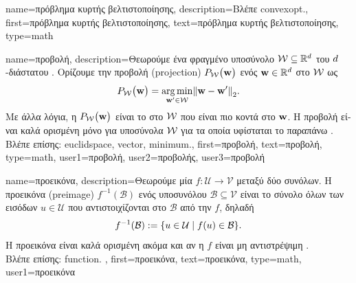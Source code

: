 {name={\foreignlanguage{greek}{πρόβλημα κυρτής βελτιστοποίησης}}, 
	description={\foreignlanguage{greek}{Βλέπε} \gls{convexopt}.},
	first={\foreignlanguage{greek}{πρόβλημα κυρτής βελτιστοποίησης}},
	text={\foreignlanguage{greek}{πρόβλημα κυρτής βελτιστοποίησης}},
	type=math
}

{name={\foreignlanguage{greek}{προβολή}}, 
       description={\foreignlanguage{greek}{Θεωρούμε ένα φραγμένο υποσύνολο} 
       		$\mathcal{W} \subseteq \mathbb{R}^{d}$ \foreignlanguage{greek}{του $d$-διάστατου} 
		. \foreignlanguage{greek}{Ορίζουμε την προβολή} (projection) $P_{\mathcal{W}}\big( {\bf w}\big)$ 
		 \foreignlanguage{greek}{ενός}  ${\bf w} \in \mathbb{R}^{d}$ \foreignlanguage{greek}{στο $\mathcal{W}$ ως}
		\begin{equation} 
   	    		\nonumber
			\label{equ_def_proj_generic_dict}
  	     		\projection{\paramspace}{\weights} = \argmin_{\weights' \in \paramspace} \normgeneric{\weights - \weights'}{2}. 
         	\end{equation}
		 \foreignlanguage{greek}{Με άλλα λόγια, η $P_{\mathcal{W}}\big( {\bf w}\big)$ είναι το}  
		 \foreignlanguage{greek}{στο $\mathcal{W}$ που είναι πιο κοντά στο ${\bf w}$. Η προβολή είναι καλά ορισμένη μόνο 
		 για υποσύνολα $\mathcal{W}$ για τα οποία υφίσταται το παραπάνω}  \cite{BoydConvexBook}.
		 \\
		 \foreignlanguage{greek}{Βλέπε επίσης:} \gls{euclidspace}, \gls{vector}, \gls{minimum}.},
	first={\foreignlanguage{greek}{προβολή}},
	text={\foreignlanguage{greek}{προβολή}},
	type=math,
	user1={\foreignlanguage{greek}{προβολή}}, %
	user2={\foreignlanguage{greek}{προβολής}}, %
	user3={\foreignlanguage{greek}{προβολή}} %
}

{name={\foreignlanguage{greek}{προεικόνα}}, 
	description={\foreignlanguage{greek}{Θεωρούμε μία}  
		$f\colon \mathcal{U} \rightarrow \mathcal{V}$ \foreignlanguage{greek}{μεταξύ δύο συνόλων. Η προεικόνα} (preimage) $f^{-1}(\mathcal{B})$ 
		\foreignlanguage{greek}{ενός υποσυνόλου $\mathcal{B} \subseteq \mathcal{V}$ 
		είναι το σύνολο όλων των εισόδων $u \in \mathcal{U}$ που αντιστοιχίζονται στο $\mathcal{B}$ από την $f$, δηλαδή}
		\[
		f^{-1}(\mathcal{B}) := \{ u \in \mathcal{U} \mid f(u) \in \mathcal{B} \}.
		\]
		\foreignlanguage{greek}{Η προεικόνα είναι καλά ορισμένη ακόμα και αν η}  $f$ \foreignlanguage{greek}{είναι 
		μη αντιστρέψιμη} \cite{RudinBookPrinciplesMatheAnalysis}. 
		\\
		\foreignlanguage{greek}{Βλέπε επίσης:} \gls{function}. },
	first={\foreignlanguage{greek}{προεικόνα}},
	text={\foreignlanguage{greek}{προεικόνα}},
	type=math,
	user1={\foreignlanguage{greek}{προεικόνα}} %
}

